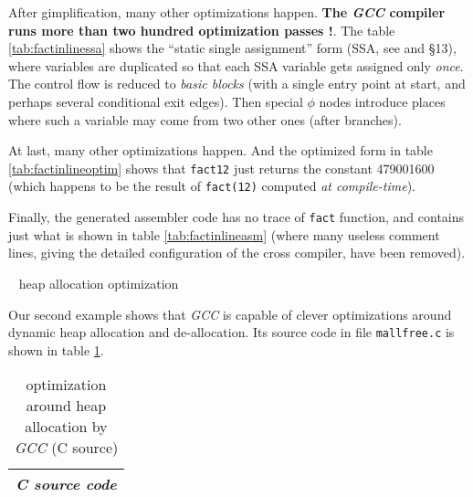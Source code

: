 After gimplification, many other optimizations happen. \textbf{The
  \emph{GCC} compiler runs more than two hundred optimization passes
  !}. The table
\ref{tab:factinlinessa} shows the ``static single assignment'' form
(SSA, see \cite{pop:ssa} and \cite{gcc-internals} \S{13}), where variables are duplicated so that each SSA
variable gets assigned only \emph{once}. The control flow is reduced
to  \emph{basic blocks} (with a single entry point
at start, and perhaps several conditional exit edges). Then special
$\phi$ nodes introduce places where such a variable may come from two
other ones (after branches).




At last, many other optimizations happen. And the optimized form in
table \ref{tab:factinlineoptim} shows that \texttt{fact12} just
returns the constant 479001600 (which happens to be the result of
\texttt{fact(12)} computed \emph{at compile-time}).

\newpage

Finally, the generated assembler code has no trace of \texttt{fact}
function, and contains just what is shown in table
\ref{tab:factinlineasm} (where many useless comment lines, giving the
detailed configuration of the cross compiler, have been removed).



\pagebreak



{{\raisebox{3pt}{\textcolor{brown}{\rule{0.2\textwidth}{2.0pt}}}} ~ \large{heap allocation optimization}}

\bigskip

Our second example shows that \emph{GCC} is capable of clever
optimizations around dynamic heap allocation and de-allocation. Its
source code in file \texttt{mallfree.c} is shown in table
\ref{tab:mallfreecsrc}.

\begin{table}[!htbp]
\caption{\label{tab:mallfreecsrc} optimization around heap allocation by \emph{GCC} (C source)}
   \medskip
  \begin{center}
    \begin{relsize}{-1.2}
     \begin{tabular}{c}
       \\ 
       \textbf{\emph{C source code}} \\ 
       \hline
     \end{tabular}
    \end{relsize}
  \end{center}
\end{table}

